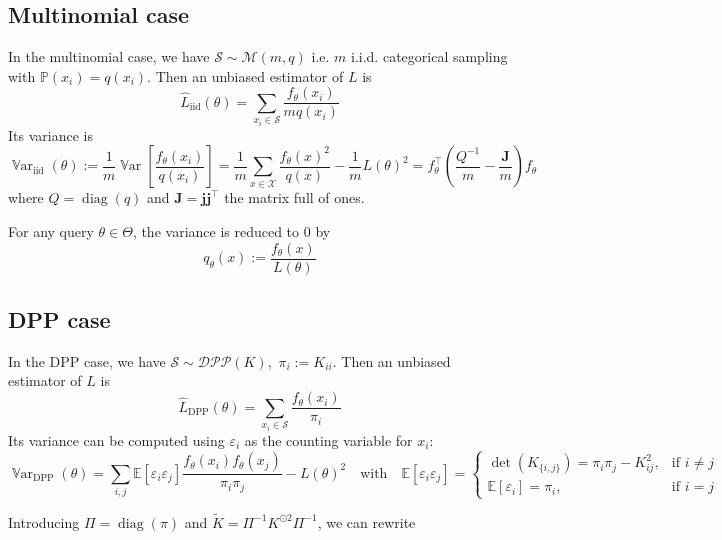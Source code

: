 \documentclass{article} %
\renewcommand{\epsilon}{\varepsilon}
\newcommand{\PP}{\mathbb{P}}
\newcommand{\EE}{\mathbb{E}}
\newcommand{\Var}{\operatorname{\mathbb V ar}}
\newcommand{\T}{^\top}  %
\newcommand{\1}{\mathds{1}} %
\newcommand{\voones}{\boldsymbol{j}} %
\newcommand{\moones}{\boldsymbol{J}} %
\theoremstyle{definition} %
\begin{document}
\subsection{Multinomial case}


In the multinomial case, we have $\mathcal S \sim \mathcal M(m, q)$ i.e. $m$ i.i.d. categorical sampling with $\PP(x_i) = q(x_i)$.
Then an unbiased estimator of $L$ is
\begin{equation*}
	\hat L_{\textrm{iid}}(\theta) = \sum_{x_i\in \mathcal S} \frac{f_\theta(x_i)}{m q(x_i)}
\end{equation*}
Its variance is
\begin{equation}
	\Var_{\textrm{iid}}(\theta) :=\frac{1}{m} \Var\left[\frac {f_{\theta}(x_i)} {q(x_i)}\right] 
	=\frac{1}{m} \sum_{x \in \mathcal{X}} \frac{f_{\theta}(x)^{2}}{q(x)} -\frac{1}{m} L(\theta)^{2} = f_\theta\T(\frac{Q^{-1}} m - \frac{\moones} m)f_\theta
\end{equation}
where $Q = \operatorname{diag}(q)$ and $\moones = \voones \voones \T$ the matrix full of ones. 

For any query $\theta \in \Theta$, the variance is reduced to 0 by
$$
q_{\theta}(x):=\frac{ f_{\theta}(x)}{L(\theta)}
$$


\subsection{DPP case}
In the DPP case, we have $ \mathcal S \sim \mathcal{DPP}(K)$, \,$\pi_i := K_{ii}$. Then an unbiased estimator of $L$ is
\begin{equation*}
	\hat L_{\textrm{DPP}}(\theta) = \sum_{x_i\in \mathcal S} \frac{f_\theta(x_i)}{\pi_i}
\end{equation*}
Its variance can be computed using $\epsilon_i$ as the counting variable for $x_i$:
$$
\Var_{\textrm{DPP}}(\theta)
=\sum_{i, j}\EE\left[\epsilon_{i} \epsilon_{j}\right] \frac{f_\theta(x_{i}) f_\theta(x_{j})} {\pi_{i} \pi_{j}}  - L(\theta)^{2}
\quad \text{with} \quad
\EE\left[\epsilon_{i} \epsilon_{j}\right]=
\begin{cases}
	\det(K_{\{i, j\}})=\pi_{i} \pi_{j}-K_{ij}^{2}, & \text{if } i \neq j \\
	\EE\left[\epsilon_{i}\right]=\pi_{i},&\text{if } i = j
\end{cases}
$$



Introducing $\Pi = \operatorname{diag}(\pi)$ and $\tilde K = \Pi^{-1}K^{\odot 2} \Pi^{-1}$, we can rewrite  
\end{document}

